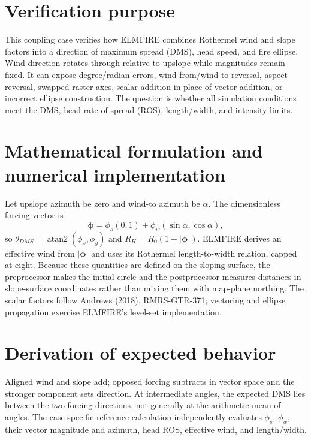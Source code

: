 \section{Verification purpose}

This coupling case verifies how ELMFIRE combines Rothermel wind and slope factors into a direction of maximum spread (DMS), head speed, and fire ellipse.  Wind direction rotates through \AngleSet{} relative to upslope while magnitudes remain fixed.  It can expose degree/radian errors, wind-from/wind-to reversal, aspect reversal, swapped raster axes, scalar addition in place of vector addition, or incorrect ellipse construction.  The question is whether all simulation conditions meet the DMS, head rate of spread (ROS), length/width, and intensity limits.

\section{Mathematical formulation and numerical implementation}
Let upslope azimuth be zero and wind-to azimuth be $\alpha$.  The dimensionless forcing vector is
\begin{equation}\boldsymbol\phi=\phi_s(0,1)+\phi_w(\sin\alpha,\cos\alpha),\end{equation}
so $\theta_{DMS}=\operatorname{atan2}(\phi_x,\phi_y)$ and $R_H=R_0(1+|\boldsymbol\phi|)$.  ELMFIRE derives an effective wind from $|\boldsymbol\phi|$ and uses its Rothermel length-to-width relation, capped at eight.  Because these quantities are defined on the sloping surface, the preprocessor makes the initial circle and the postprocessor measures distances in slope-surface coordinates rather than mixing them with map-plane northing.  The scalar factors follow Andrews (2018), RMRS-GTR-371; vectoring and ellipse propagation exercise ELMFIRE's level-set implementation.

\section{Derivation of expected behavior}
Aligned wind and slope add; opposed forcing subtracts in vector space and the stronger component sets direction.  At intermediate angles, the expected DMS lies between the two forcing directions, not generally at the arithmetic mean of angles.  The case-specific reference calculation independently evaluates $\phi_s$, $\phi_w$, their vector magnitude and azimuth, head ROS, effective wind, and length/width.

